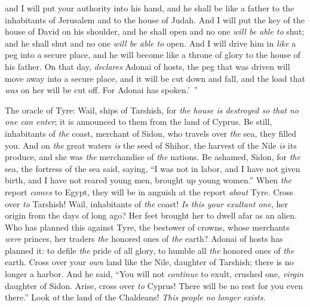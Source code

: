 \begin{biblechapter}
and I will put your authority into his hand, 
and he shall be like a father to the inhabitants of Jerusalem 
and to the house of Judah.
\verse And I will put the key of the house of David on his shoulder, 
and he shall open and no one \textit{will be able to} shut; 
and he shall shut and no one \textit{will be able to} open.
\verse And I will drive him in \textit{like} a peg into a secure place, 
and he will become like a throne of glory to the house of his father.
\verse On that day, \textit{declares} Adonai of hosts, the peg that was driven will move away into a secure place, and it will be cut down and fall, and the load that \textit{was} on her will be cut off. For Adonai has spoken.’ ”
\end{biblechapter}

\begin{biblechapter} %
 The oracle of Tyre:
\verse Wail, ships of Tarshish, for \textit{the house is destroyed so that no one can enter}; 
it is announced to them from the land of Cyprus.
\verse Be still, inhabitants of \textit{the} coast, 
merchant of Sidon, who travels over \textit{the} sea, they filled you.
\verse And on \textit{the} great waters \textit{is} the seed of Shihor, 
the harvest of the Nile \textit{is} its produce, 
and she was \textit{the} merchandise of \textit{the} nations.
\verse Be ashamed, Sidon, for \textit{the} sea, 
the fortress of the sea said, saying, 
“I was not in labor, 
and I have not given birth, 
and I have not reared young men, 
brought up young women.”
\verse When \textit{the} report \textit{comes} to Egypt, 
they will be in anguish at the report \textit{about} Tyre.
\verse Cross over \textit{to} Tarshish! 
Wail, inhabitants of \textit{the} coast!
\verse \textit{Is this your exultant one}, her origin from the days of long ago? 
Her feet brought her to dwell afar as an alien.
\verse Who has planned this against Tyre, the bestower of crowns, 
whose merchants \textit{were} princes, 
her traders \textit{the} honored ones of \textit{the} earth?
\verse Adonai of hosts has planned it: 
to defile \textit{the} pride of all glory, 
to humble all \textit{the} honored ones of \textit{the} earth.
\verse Cross over your \textit{own} land like the Nile, daughter of Tarshish; 
there is no longer a harbor.
\verse And he said,
\verse “You will not \textit{continue} to exult, crushed one, \textit{virgin} daughter of Sidon. 
Arise, cross over \textit{to} Cyprus! There will be no rest for you even there.”
\verse Look \textit{at} the land of the Chaldeans! 
\textit{This people no longer exists. 
}
\end{biblechapter}
